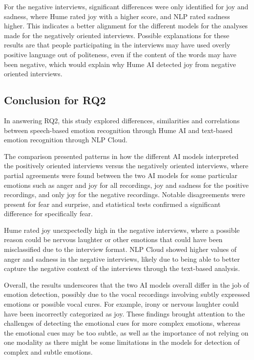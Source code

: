 For the negative interviews, significant differences were only identified for joy and sadness, where Hume rated joy with a higher score, and NLP rated sadness higher. This indicates a better alignment for the different models for the analyses made for the negatively oriented interviews. Possible explanations for these results are that people participating in the interviews may have used overly positive language out of politeness, even if the content of the words may have been negative, which would explain why Hume AI detected joy from negative oriented interviews.


\subsection{Conclusion for RQ2}
In answering RQ2, this study explored differences, similarities and correlations between speech-based emotion recognition through Hume AI and text-based emotion recognition through NLP Cloud.

The comparison presented patterns in how the different AI models interpreted the positively oriented interviews versus the negatively oriented interviews, where partial agreements were found between the two AI models for some particular emotions such as anger and joy for all recordings, joy and sadness for the positive recordings, and only joy for the negative recordings. Notable disagreements were present for fear and surprise, and statistical tests confirmed a significant difference for specifically fear.

Hume rated joy unexpectedly high in the negative interviews, where a possible reason could be nervous laughter or other emotions that could have been misclassified due to the interview format. NLP Cloud showed higher values of anger and sadness in the negative interviews, likely due to being able to better capture the negative context of the interviews through the text-based analysis.

Overall, the results underscores that the two AI models overall differ in the job of emotion detection, possibly due to the vocal recordings involving subtly expressed emotions or possible vocal cures. For example, irony or nervous laughter could have been incorrectly categorized as joy. These findings brought attention to the challenges of detecting the emotional cues for more complex emotions, whereas the emotional cues may be too subtle, as well as the importance of not relying on one modality as there might be some limitations in the models for detection of complex and subtle emotions.
